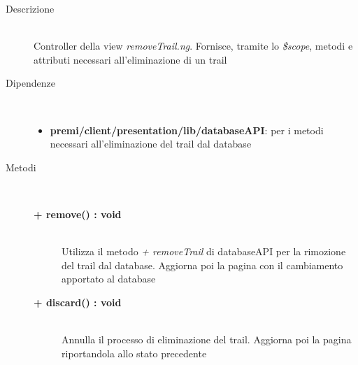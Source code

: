 \begin{description}
\item[Descrizione] \hfill \\
	Controller della view \textit{removeTrail.ng}. Fornisce, tramite lo \textit{\$scope}, metodi e attributi necessari all'eliminazione di un trail
	
	
\item[Dipendenze] \hfill \\
	\begin{itemize}
		\item \textbf{premi/client/presentation/lib/databaseAPI}: per i metodi necessari all'eliminazione del trail dal database
	\end{itemize}
	
	
\item[Metodi] \hfill \\

	\begin{description}
		\item[\textbf{\color{blue}+ remove() : void			}] \hfill \\
			Utilizza il metodo \textit{+ removeTrail} di databaseAPI per la rimozione del trail dal database. Aggiorna poi la pagina con il cambiamento apportato al database
	\end{description}
	
	\begin{description}
		\item[\textbf{\color{blue}+ discard() : void			}] \hfill \\
			Annulla il processo di eliminazione del trail. Aggiorna poi la pagina riportandola allo stato precedente
	\end{description}

\end{description}
	







